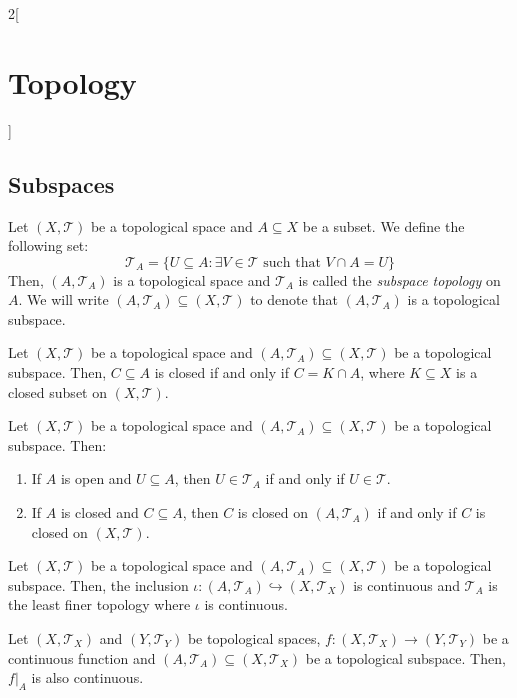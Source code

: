 \documentclass[../../../main.tex]{subfiles}
\begin{document}
\begin{multicols}{2}[\section{Topology}]
  \subsection{Subspaces}
  \begin{definition}
    Let $(X,\mathcal{T})$ be a topological space and $A\subseteq X$ be a subset. We define the following set: $$\mathcal{T}_A=\{U\subseteq A:\exists V\in\mathcal{T}\text{ such that }V\cap A=U\}$$ Then, $(A,\mathcal{T}_A)$ is a topological space and $\mathcal{T}_A$ is called the \textit{subspace topology} on $A$. We will write $(A,\mathcal{T}_A)\subseteq (X,\mathcal{T})$ to denote that $(A,\mathcal{T}_A)$ is a topological subspace.
  \end{definition}
  \begin{prop}
    Let $(X,\mathcal{T})$ be a topological space and $(A,\mathcal{T}_A)\subseteq (X,\mathcal{T})$ be a topological subspace. Then, $C\subseteq A$ is closed if and only if $C=K\cap A$, where $K\subseteq X$ is a closed subset on $(X,\mathcal{T})$.
  \end{prop}
  \begin{prop}
    Let $(X,\mathcal{T})$ be a topological space and $(A,\mathcal{T}_A)\subseteq (X,\mathcal{T})$ be a topological subspace. Then:
    \begin{enumerate}
      \item If $A$ is open and $U\subseteq A$, then $U\in\mathcal{T}_A$ if and only if $U\in\mathcal{T}$.
      \item If $A$ is closed and $C\subseteq A$, then $C$ is closed on $(A,\mathcal{T}_A)$ if and only if $C$ is closed on $(X,\mathcal{T})$.
    \end{enumerate}
  \end{prop}
  \begin{prop}
    Let $(X,\mathcal{T})$ be a topological space and $(A,\mathcal{T}_A)\subseteq (X,\mathcal{T})$ be a topological subspace. Then, the inclusion $\iota:(A,\mathcal{T}_A)\hookrightarrow (X,\mathcal{T}_X)$ is continuous and $\mathcal{T}_A$ is the least finer topology where $\iota$ is continuous.
  \end{prop}
  \begin{corollary}
    Let $(X,\mathcal{T}_X)$ and $(Y,\mathcal{T}_Y)$ be topological spaces, $f:(X,\mathcal{T}_X)\rightarrow (Y,\mathcal{T}_Y)$ be a continuous function and $(A,\mathcal{T}_A)\subseteq (X,\mathcal{T}_X)$ be a topological subspace. Then, $f|_A$ is also continuous.
  \end{corollary}
  \begin{prop}

\end{prop}
\end{multicols}
\end{document}
